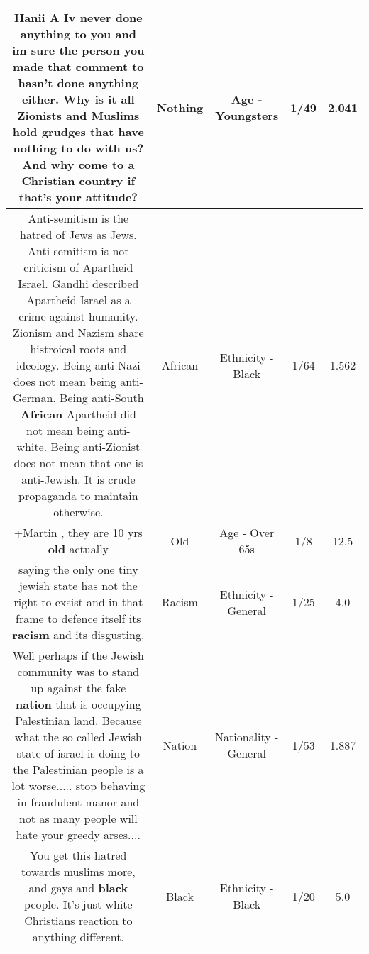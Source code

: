 \documentclass[11pt]{article}
\newlength\mylength
\begin{document}
\begin{center}
\begin{longtable}{|C{.65\mylength}|C{.30\mylength}|C{.12\mylength}|C{.12\mylength}|C{.12\mylength}|}
  \small Hanii A Iv never done anything to you and im sure the person you made that comment to hasn't done anything either. Why is it all Zionists and Muslims hold grudges that have \textbf{nothing} to do with us? And why come to a Christian country if that's your attitude?\normalsize   & Nothing & Age - Youngsters & 1/49 & 2.041 \\  \hline
  \small Anti-semitism is the hatred of Jews as Jews. Anti-semitism is not criticism of Apartheid Israel. Gandhi described Apartheid Israel as a crime against humanity. Zionism and Nazism share histroical roots and ideology. Being anti-Nazi does not mean being anti-German. Being anti-South \textbf{African} Apartheid did not mean being anti-white. Being anti-Zionist does not mean that one is anti-Jewish. It is crude propaganda to maintain otherwise.\normalsize   & African & Ethnicity - Black & 1/64 & 1.562 \\  \hline
  \small +Martin , they are 10 yrs \textbf{old} actually\normalsize   & Old & Age - Over 65s & 1/8 & 12.5 \\  \hline
  \small saying the only one tiny jewish state has not the right to exsist and in that frame to defence itself its \textbf{racism} and its disgusting.\normalsize   & Racism & Ethnicity - General & 1/25 & 4.0 \\  \hline
  \small Well perhaps if the Jewish community was to stand up against the fake \textbf{nation} that is occupying Palestinian land.  Because what the so called Jewish state of israel is doing to the Palestinian people is a lot worse.....   stop behaving in fraudulent manor and not as many people will hate your greedy arses....\normalsize   & Nation & Nationality - General & 1/53 & 1.887 \\  \hline
  \small You get this hatred towards muslims more, and gays and \textbf{black} people. It's just white Christians reaction to anything different.\normalsize   & Black & Ethnicity - Black & 1/20 & 5.0 \\  \hline

\end{longtable}
\end{center}
\end{document}
